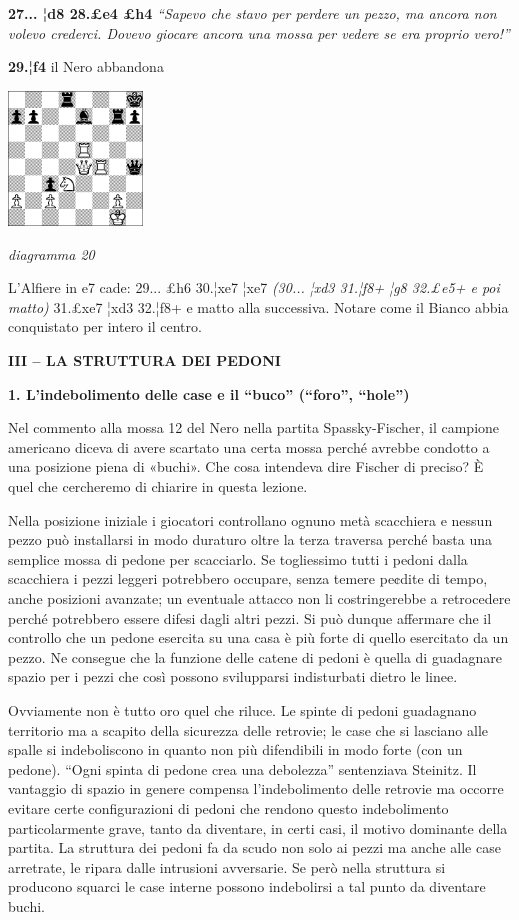 \documentclass[
]{article}
\begin{document}
\textbf{27... ¦d8 28.£e4 £h4} \emph{``Sapevo che stavo per perdere un
pezzo, ma ancora non volevo crederci. Dovevo giocare ancora una mossa
per vedere se era proprio vero!''}

\textbf{29.¦f4} il Nero abbandona

\includegraphics[width=1.40972in,height=1.40972in]{vertopal_109f12be458a423d8f3cc838880eaea2/media/image20.png}

\emph{diagramma 20}

L'Alfiere in e7 cade: 29... £h6 30.¦xe7 ¦xe7 \emph{(30... ¦xd3 31.¦f8+
¦g8 32.£e5+ e poi matto)} 31.£xe7 ¦xd3 32.¦f8+ e matto alla successiva.
Notare come il Bianco abbia conquistato per intero il centro.

\textbf{III -- LA STRUTTURA DEI PEDONI}

\textbf{1. L'indebolimento delle case e il ``buco'' (``foro'',
``hole'')}

Nel commento alla mossa 12 del Nero nella partita Spassky-Fischer, il
campione americano diceva di avere scartato una certa mossa perché
avrebbe condotto a una posizione piena di «buchi». Che cosa intendeva
dire Fischer di preciso? È quel che cercheremo di chiarire in questa
lezione.

Nella posizione iniziale i giocatori controllano ognuno metà scacchiera
e nessun pezzo può installarsi in modo duraturo oltre la terza traversa
perché basta una semplice mossa di pedone per scacciarlo. Se togliessimo
tutti i pedoni dalla scacchiera i pezzi leggeri potrebbero occupare,
senza temere pe¢dite di tempo, anche posizioni avanzate; un eventuale
attacco non li costringerebbe a retrocedere perché potrebbero essere
difesi dagli altri pezzi. Si può dunque affermare che il controllo che
un pedone esercita su una casa è più forte di quello esercitato da un
pezzo. Ne consegue che la funzione delle catene di pedoni è quella di
guadagnare spazio per i pezzi che così possono svilupparsi indisturbati
dietro le linee.

Ovviamente non è tutto oro quel che riluce. Le spinte di pedoni
guadagnano territorio ma a scapito della sicurezza delle retrovie; le
case che si lasciano alle spalle si indeboliscono in quanto non più
difendibili in modo forte (con un pedone). ``Ogni spinta di pedone crea
una debolezza'' sentenziava Steinitz. Il vantaggio di spazio in genere
compensa l'indebolimento delle retrovie ma occorre evitare certe
configurazioni di pedoni che rendono questo indebolimento
particolarmente grave, tanto da diventare, in certi casi, il motivo
dominante della partita. La struttura dei pedoni fa da scudo non solo ai
pezzi ma anche alle case arretrate, le ripara dalle intrusioni
avversarie. Se però nella struttura si producono squarci le case interne
possono indebolirsi a tal punto da diventare buchi.
\end{document}

